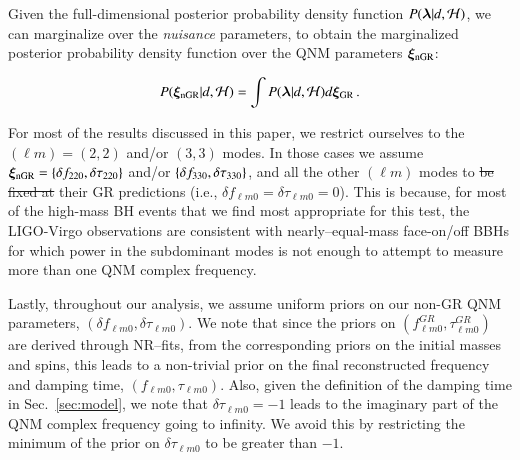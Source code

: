Given the full-dimensional posterior probability density function $P(\bm{\lambda} | d, \mathcal{H})$, we can marginalize over the \emph{nuisance} parameters, to obtain the marginalized posterior probability density function over the QNM parameters $\bm{\xi}_{\text{nGR}}$:

\begin{equation}
P(\bm{\xi}_{\text{nGR}} | d, \mathcal{H})= \int P(\bm{\lambda} | d, \mathcal{H}) d\bm{\xi}_{\text{GR}}\,.
\end{equation}

For most of the results discussed in this paper, we restrict ourselves
to the $(\ell m) = (2,2)$ and/or $(3,3)$ modes. In those cases we assume $\bm{\xi}_{\text{nGR}} = \{\delta f_{\text{220}},\delta \tau_{\text{220}}\}$ and/or $
\{\delta f_{\text{330}},\delta \tau_{\text{330}}\}$, and  all the other $(\ell m)$ modes to \sout{be
fixed at} their GR predictions (i.e., $\delta f_{\ell m 0} = \delta
\tau_{\ell m 0} = 0$). This is because, for most of the high-mass BH
events that we find most appropriate for this test, the LIGO-Virgo
observations are consistent with nearly--equal-mass face-on/off BBHs
for which power in the subdominant modes is not enough to
attempt to measure more than one QNM complex frequency.

Lastly, throughout our analysis, we assume uniform priors on our non-GR QNM
parameters, $(\delta f_{\ell m 0},\delta \tau_{\ell m 0})$. We note that
since the priors on $( f_{\ell m 0}^{GR},\tau_{\ell m 0}^{GR})$ are
derived through NR--fits, from the corresponding priors on the initial
masses and spins, this leads to a non-trivial prior on the final
reconstructed frequency and damping time, $( f_{\ell m 0},\tau_{\ell m
  0})$. Also, given the definition of the damping time in
Sec.~\ref{sec:model}, we note that $\delta \tau_{\ell m 0} = -1$ leads
to the imaginary part of the QNM complex frequency going to infinity. We avoid
this by restricting the minimum of the prior on $\delta \tau_{\ell m
  0}$ to be greater than $-1$.

\iffalse
\subsection{Priors}

Throughout our analysis we assume a completely prior uniform in the component masses $m_1, m_2$. Our prior on the spins are uniform in the magnitude between (0,1) and isotropic in spin orientation, but finally restricted to the component parallel to the orbital angular momentum of the binary. The prior on the distance varies as $d_L^2$ giving more weightage to binaries farther out. For the rest of the parameters we use standard priors as defined in the documentation (CITE Vietch et al. 2015 LALInference paper). For our non-GR ringdown parameters, we assume uniform priors. This of course leads to a non-trivial prior on the reconstructed frequency and damping time, because of the prior on $( f_{\ell m 0}^{GR},\tau_{\ell m 0}^{GR})$, which itself depend on the prior on the initial masses and spins through NR fits \abhi{perhaps figure on priors on QNM quantities}. For $d\tau = -1$, we encounter a singularity (the imaginary part of the frequency goes to infinity), which we avoid by restricting the minimum of the prior on $d\tau$ to be greater than $-1$.
\fi
